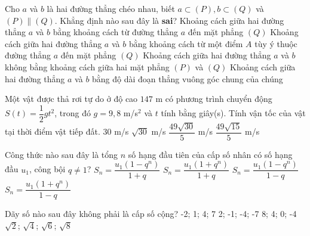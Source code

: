 \begin{ex}%
	Cho $ a $ và $ b $ là hai đường thẳng chéo nhau, biết $ a\subset (P), b\subset (Q) $ và $ (P)\parallel (Q) $. Khẳng định nào sau đây là \textbf{sai}?
	\choice
	{Khoảng cách giữa hai đường thẳng $ a $ và $ b $ bằng khoảng cách từ đường thẳng $ a $ đến mặt phẳng $ (Q) $}
	{Khoảng cách giữa hai đường thẳng $ a $ và $ b $ bằng khoảng cách từ một điểm $ A $ tùy ý thuộc đường thẳng $ a $ đến mặt phẳng $ (Q) $}
	{\True Khoảng cách giữa hai đường thẳng $ a $ và $ b $ không bằng khoảng cách giữa hai mặt phẳng $ (P) $ và $ (Q) $}
	{Khoảng cách giữa hai đường thẳng $ a $ và $ b $ bằng độ dài đoạn thẳng vuông góc chung của chúng}
\end{ex}

\begin{ex}%
	Một vật được thả rơi tự do ở độ cao $ 147 $ m có phương trình chuyển động $ S(t)=\dfrac{1}{2}gt^2 $, trong đó $ g=9,8 $ m/s$ ^2 $ và $ t $ tính bằng giây(s). Tính vận tốc của vật tại thời điểm vật tiếp đất. 
	\choice
	{$30$ m/s}
	{$\sqrt{30}$ m/s}
	{\True $\dfrac{49\sqrt{30}}{5}$ m/s}
	{$\dfrac{49\sqrt{15}}{5}$ m/s}
\end{ex}

\begin{ex}%
		Công thức nào sau đây là tổng $n$ số hạng đầu tiên của cấp số nhân có số hạng đầu $u_1$, công bội $q\ne 1$? 
		\choice
		{$S_n=\dfrac{u_1(1-q^n)}{1+q}$ }
		{$S_n=\dfrac{u_1(1+q^n)}{1+q}$ }
		{\True $S_n=\dfrac{u_1(1-q^n)}{1-q}$ }
		{$S_n=\dfrac{u_1(1+q^n)}{1-q}$
		}
	\end{ex}

\begin{ex}%
		Dãy số nào sau đây không phải là cấp số cộng?
		\choice
		{-2; 1; 4; 7}
		{2; -1; -4; -7}
		{8; 4; 0; -4}
		{\True $\sqrt{2}$; $\sqrt{4}$; $\sqrt{6}$; $\sqrt{8}$}
	\end{ex}

